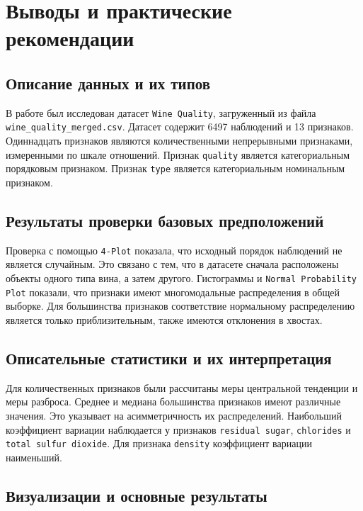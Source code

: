 \newpage

\section*{Выводы и практические рекомендации}

\subsection*{Описание данных и их типов}
 
В работе был исследован датасет \texttt{Wine Quality}, загруженный из файла \texttt{wine\_quality\_merged.csv}. Датасет содержит 6497 наблюдений и 13 признаков. Одиннадцать признаков являются количественными непрерывными признаками, измеренными по шкале отношений. Признак \texttt{quality} является категориальным порядковым признаком. Признак \texttt{type} является категориальным номинальным признаком.
 
\subsection*{Результаты проверки базовых предположений}
 
Проверка с помощью \texttt{4-Plot} показала, что исходный порядок наблюдений не является случайным. Это связано с тем, что в датасете сначала расположены объекты одного типа вина, а затем другого. Гистограммы и \texttt{Normal Probability Plot} показали, что признаки имеют многомодальные распределения в общей выборке. Для большинства признаков соответствие нормальному распределению является только приблизительным, также имеются отклонения в хвостах.
 
\subsection*{Описательные статистики и их интерпретация}
 
Для количественных признаков были рассчитаны меры центральной тенденции и меры разброса. Среднее и медиана большинства признаков имеют различные значения. Это указывает на асимметричность их распределений. Наибольший коэффициент вариации наблюдается у признаков \texttt{residual sugar}, \texttt{chlorides} и \texttt{total sulfur dioxide}. Для признака \texttt{density} коэффициент вариации наименьший.

\subsection*{Визуализации и основные результаты}
 
